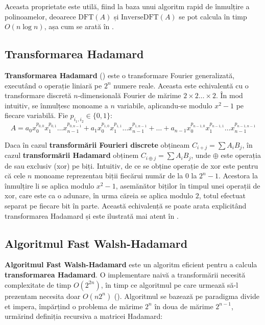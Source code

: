 Aceasta proprietate este utilă, fiind la baza unui algoritm rapid de înmulțire a
polinoamelor, deoarece $\text{DFT}(A)$ și $\text{InverseDFT}(A)$ se pot calcula
în timp $O(n \log n)$, așa cum se arată în \cite{fftpoly}.

\subsection{Transformarea Hadamard}
\label{hadamard}

\textbf{Transformarea Hadamard} (\cite{hadamard}) este o transformare Fourier generalizată,
executând o operație liniară pe $2^{n}$ numere reale. Aceasta este echivalentă
cu o transformare discretă $n$-dimensională Fourier de mărime
$2 \times 2 \ldots \times 2$. În mod intuitiv, se înmulțesc monoame a $n$
variabile, aplicandu-se modulo $x^{2}-1$ pe fiecare variabilă. Fie $p_{i_{1}, i_{2}} \in \{0, 1\}$:
\begin{equation}
  A = a_{0} x_{0}^{p_{0, 0}} x_{1}^{p_{0, 1}} \ldots x_{n-1}^{p_{0, n-1}}
  + a_{1} x_{0}^{p_{1, 0}} x_{1}^{p_{1, 1}} \ldots x_{n-1}^{p_{1, n-1}}
  + \ldots
  + a_{n-1} x_{0}^{p_{n-1, 0}} x_{1}^{p_{n-1, 1}} \ldots x_{n-1}^{p_{n-1, n-1}}
\end{equation}

Daca în cazul \textbf{transformării Fourieri discrete} obțineam
$C_{i+j} = \displaystyle\sum\limits A_{i} B_{j}$, în cazul \textbf{transformării Hadamard} obținem
$C_{i \oplus j} = \displaystyle\sum\limits A_{i} B_{j}$, unde $\oplus$ este operația de sau exclusiv
(xor) pe biți. Intuitiv, de ce se obține operație de xor este pentru că
cele $n$ monoame reprezentau biții fiecărui număr de la $0$ la $2^{n} - 1$.
Acestora la înmulțire li se aplica modulo $x^{2} - 1$, asemănător biților în
timpul unei operații de xor, care este ca o adunare, în urma căreia se aplica
modulo $2$, totul efectuat separat pe fiecare bit în parte. Această echivalență
se poate arata explicitând transformarea Hadamard și este ilustrată mai atent în
\cite{hadamard}.

\subsection{Algoritmul Fast Walsh-Hadamard}
\label{fasthadamard}

\textbf{Algoritmul Fast Walsh-Hadamard} este un algoritm eficient pentru a
calcula \textbf{transformarea Hadamard}. O implementare naivă a transformării
necesită complexitate de timp $O(2^{2n})$, în timp ce algoritmul pe care urmează
să-l prezentam necesita doar $O(n2^{n})$ (\cite{fwht}). Algoritmul se bazează pe paradigma
divide et impera, împărțind o problema de mărime $2^{n}$ în doua de mărime
$2^{n-1}$, urmărind definiția recursiva a matricei Hadamard:

